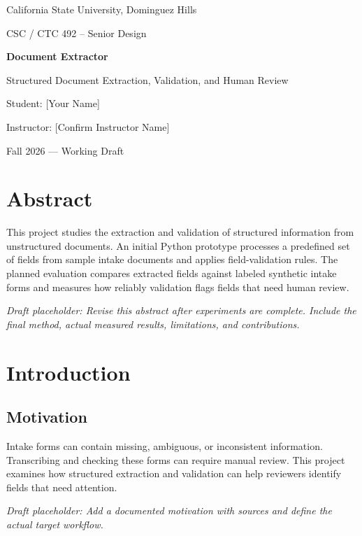 \documentclass[11pt,letterpaper]{report}
\newcommand{\todowrite}[1]{\par\noindent\textit{Draft placeholder: #1}\par}
\begin{document}

\begin{titlepage}
\centering
\vspace*{1.3in}
{\Large California State University, Dominguez Hills\par}
\vspace{0.3in}
{\large CSC / CTC 492 -- Senior Design\par}
\vspace{0.9in}
{\Huge\bfseries Document Extractor\par}
\vspace{0.25in}
{\Large Structured Document Extraction, Validation, and Human Review\par}
\vspace{1.1in}
{\large Student: [Your Name]\par}
\vspace{0.15in}
{\large Instructor: [Confirm Instructor Name]\par}
\vfill
{\large Fall 2026 --- Working Draft\par}
\end{titlepage}

\chapter*{Abstract}
This project studies the extraction and validation of structured information from
unstructured documents. An initial Python prototype processes a predefined set
of fields from sample intake documents and applies field-validation rules.
The planned evaluation compares extracted fields against labeled synthetic
intake forms and measures how reliably validation flags fields that need human
review.
\todowrite{Revise this abstract after experiments are complete. Include the final method, actual measured results, limitations, and contributions.}

\tableofcontents
\clearpage
{}

\chapter{Introduction}
\section{Motivation}
Intake forms can contain missing, ambiguous, or inconsistent information.
Transcribing and checking these forms can require manual review. This project
examines how structured extraction and validation can help reviewers identify
fields that need attention.
\todowrite{Add a documented motivation with sources and define the actual target workflow.}
\end{document}
